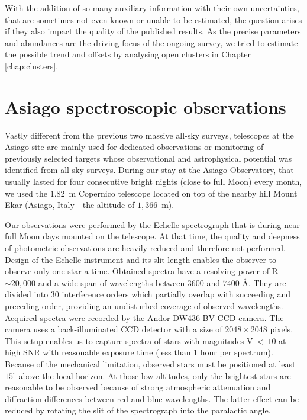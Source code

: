 \begin{itemize}
	With the addition of so many auxiliary information with their own uncertainties, that are sometimes not even known or unable to be estimated, the question arises if they also impact the quality of the published results. As the precise parameters and abundances are the driving focus of the ongoing survey, we tried to estimate the possible trend and offsets by analysing open clusters in Chapter \ref{chap:clusters}.
	
\end{itemize}

\section{Asiago spectroscopic observations}
\label{sec:asiago_data}
Vastly different from the previous two massive all-sky surveys, telescopes at the Asiago site are mainly used for dedicated observations or monitoring of previously selected targets whose observational and astrophysical potential was identified from all-sky surveys. During our stay at the Asiago Observatory, that usually lasted for four consecutive bright nights (close to full Moon) every month, we used the $1.82$~m Copernico telescope located on top of the nearby hill Mount Ekar (Asiago, Italy - the altitude of $1,366$~m).

Our observations were performed by the Echelle spectrograph that is during near-full Moon days mounted on the telescope. At that time, the quality and deepness of photometric observations are heavily reduced and therefore not performed. Design of the Echelle instrument and its slit length enables the observer to observe only one star a time. Obtained spectra have a resolving power of R$\sim20,000$ and a wide span of wavelengths between $3600$ and $7400$ \AA. They are divided into 30 interference orders which partially overlap with succeeding and preceding order, providing an undisturbed coverage of observed wavelengths. Acquired spectra were recorded by the Andor DW436-BV CCD camera. The camera uses a back-illuminated CCD detector with a size of $2048 \times 2048$ pixels. This setup enables us to capture spectra of stars with magnitudes V~<~$10$ at high SNR with reasonable exposure time (less than 1 hour per spectrum). Because of the mechanical limitation, observed stars must be positioned at least $15^\circ$ above the local horizon. At those low altitudes, only the brightest stars are reasonable to be observed because of strong atmospheric attenuation and diffraction differences between red and blue wavelengths. The latter effect can be reduced by rotating the slit of the spectrograph into the paralactic angle.

